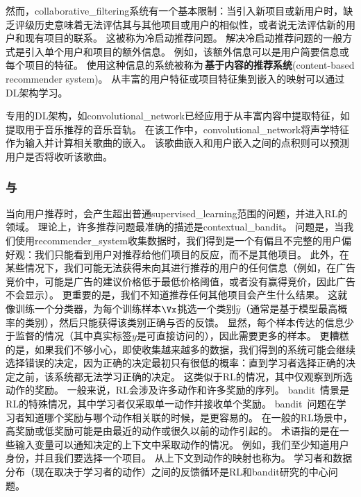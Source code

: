 然而，\gls{collaborative_filtering}系统有一个基本限制：当引入新项目或新用户时，缺乏评级历史意味着无法评估其与其他项目或用户的相似性，或者说无法评估新的用户和现有项目的联系。
这被称为冷启动推荐问题。
解决冷启动推荐问题的一般方式是引入单个用户和项目的额外信息。
例如，该额外信息可以是用户简要信息或每个项目的特征。
使用这种信息的系统被称为\,\textbf{基于内容的推荐系统}(content-based recommender system)。
从丰富的用户特征或项目特征集到嵌入的映射可以通过\gls{DL}架构学习\citep{Huang-et-al-2013,Elkahky-et-al-2015}。

专用的\gls{DL}架构，如\gls{convolutional_network}已经应用于从丰富内容中提取特征，如提取用于音乐推荐的音乐音轨\citep{vandenOord-et-al-NIPS2013}。
在该工作中，\gls{convolutional_network}将声学特征作为输入并计算相关歌曲的嵌入。
该歌曲嵌入和用户嵌入之间的点积则可以预测用户是否将收听该歌曲。


\subsubsection{与}
当向用户推荐时，会产生超出普通\gls{supervised_learning}范围的问题，并进入\gls{RL}的领域。
理论上，许多推荐问题最准确的描述是\gls{contextual_bandit}\citep{Langford+Zhang-NIPS2008,Lu-et-al-2010}。
问题是，当我们使用\gls{recommender_system}收集数据时，我们得到是一个有偏且不完整的用户偏好观：我们只能看到用户对推荐给他们项目的反应，而不是其他项目。
此外，在某些情况下，我们可能无法获得未向其进行推荐的用户的任何信息（例如，在广告竞价中，可能是广告的建议价格低于最低价格阈值，或者没有赢得竞价，因此广告不会显示）。
更重要的是，我们不知道推荐任何其他项目会产生什么结果。
这就像训练一个分类器，为每个训练样本$\Vx$挑选一个类别$\hat y$（通常是基于模型最高概率的类别），然后只能获得该类别正确与否的反馈。
显然，每个样本传达的信息少于监督的情况（其中真实标签$y$是可直接访问的），因此需要更多的样本。
更糟糕的是，如果我们不够小心，即使收集越来越多的数据，我们得到的系统可能会继续选择错误的决定，因为正确的决定最初只有很低的概率：直到学习者选择正确的决定之前，该系统都无法学习正确的决定。
这类似于\gls{RL}的情况，其中仅观察到所选动作的奖励。
一般来说，\gls{RL}会涉及许多动作和许多奖励的序列。
\gls{bandit}~情景是\gls{RL}的特殊情况，其中学习者仅采取单一动作并接收单个奖励。
\gls{bandit}~问题在学习者知道哪个奖励与哪个动作相关联的时候，是更容易的。
在一般的\gls{RL}场景中，高奖励或低奖励可能是由最近的动作或很久以前的动作引起的。
术语指的是在一些输入变量可以通知决定的上下文中采取动作的情况。
例如，我们至少知道用户身份，并且我们要选择一个项目。
从上下文到动作的映射也称为。
学习者和数据分布（现在取决于学习者的动作）之间的反馈循环是\gls{RL}和\gls{bandit}研究的中心问题。

